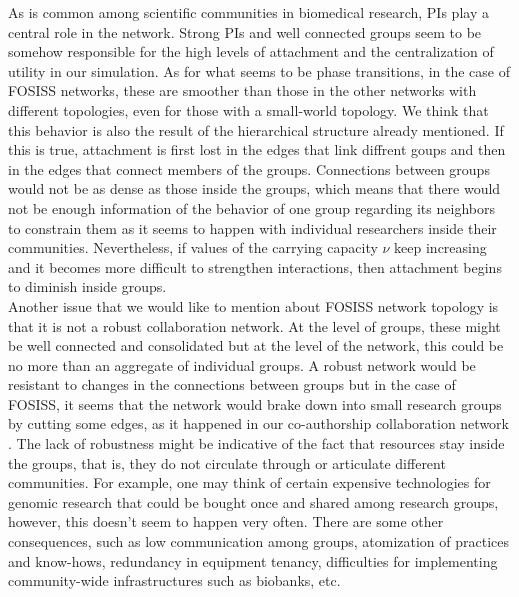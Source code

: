\documentclass[11pt]{article}
\begin{document}
{{\color{red}As is common among scientific communities in biomedical research, PIs play a central role in the network. Strong PIs and
well connected groups seem to be somehow responsible for the high levels of attachment and the centralization of utility in
our simulation. As for what seems to be phase transitions, in the case of FOSISS networks, these are smoother than
those in the other networks with different topologies, even for those with a small-world topology. We think that this
behavior is also the result of the hierarchical structure already mentioned. If this is true, attachment is first lost in the
edges that link diffrent goups and then in the edges that connect members of the groups. Connections between groups would not
be as dense as those inside the groups, which means that there would not be enough information of the behavior of one group regarding
its neighbors to constrain them as it seems to happen with individual researchers inside their communities. Nevertheless,
if values of the carrying capacity $\nu$ keep increasing and it becomes more
difficult to strengthen interactions, then attachment begins to diminish inside groups.}\\

{\color{red}Another issue that we would like to mention about FOSISS network topology is that it is not a robust collaboration network.
At the level of groups, these might be well connected and consolidated but at the level of the network, this could be
no more than an aggregate of individual groups. A robust network would be resistant to changes in the connections
between groups but in the case of FOSISS, it seems that the network would brake down into
small research groups by cutting some edges, as it happened in our co-authorship
collaboration network \cite{HernandezLemus2013}. The lack of robustness might be 
indicative of the fact that resources stay inside the groups, that is, they do not circulate through or articulate different communities. For
example, one may think of certain expensive technologies for genomic research that could be bought once and shared
among research groups, however, this doesn't seem to happen very often. There are some other
consequences, such as low communication among groups, atomization of practices and know-hows, redundancy in equipment tenancy,
difficulties for implementing community-wide infrastructures such as biobanks, etc.}\\ 

}
\end{document}
